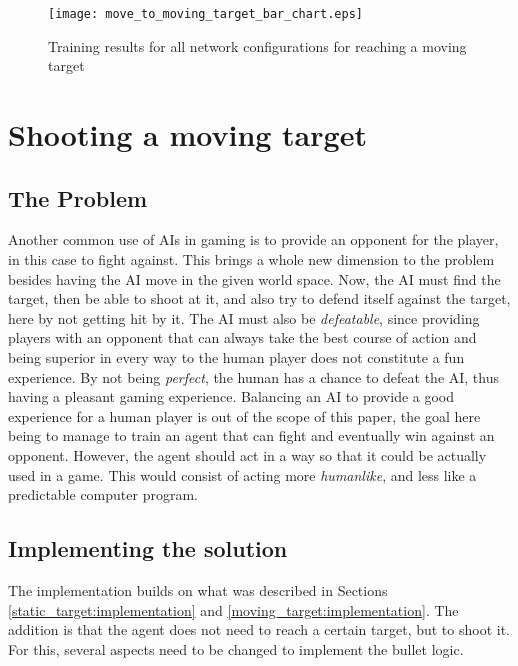 \begin{figure}
    \begin{center}
        \texttt{[image: move\_to\_moving\_target\_bar\_chart.eps]}
        \caption{Training results for all network configurations for reaching a moving target}
        \label{train_results_moving_bar_chart}
    \end{center}
\end{figure}






\section{Shooting a moving target}

\subsection{The Problem}

Another common use of AIs in gaming is to provide an opponent for the player, in this case to fight against. This brings a whole new dimension to the problem besides having the AI move in the given world space. Now, the AI must find the target, then be able to shoot at it, and also try to defend itself against the target, here by not getting hit by it. The AI must also be \emph{defeatable}, since providing players with an opponent that can always take the best course of action and being superior in every way to the human player does not constitute a fun experience. By not being \emph{perfect}, the human has a chance to defeat the AI, thus having a pleasant gaming experience. Balancing an AI to provide a good experience for a human player is out of the scope of this paper, the goal here being to manage to train an agent that can fight and eventually win against an opponent. However, the agent should act in a way so that it could be actually used in a game. This would consist of acting more \emph{humanlike}, and less like a predictable computer program.

\subsection{Implementing the solution}

The implementation builds on what was described in Sections \ref{static_target:implementation} and \ref{moving_target:implementation}. The addition is that the agent does not need to reach a certain target, but to shoot it. For this, several aspects need to be changed to implement the bullet logic.

